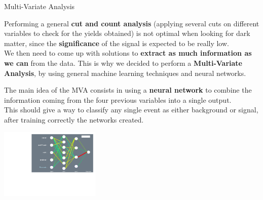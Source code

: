 \documentclass[handout,8 pt]{beamer}
\begin{document}
\begin{frame}{Multi-Variate Analysis}

	\justifying 
	Performing a general \textbf{cut and count analysis} (applying several cuts on different variables to check for the yields obtained) is not optimal when looking for dark matter, since the \textbf{significance} of the signal is expected to be really low. \\ \vspace{10pt}
	 We then need to come up with solutions to \textbf{extract as much information as we can} from the data. This is why we decided to perform a \textbf{Multi-Variate Analysis}, by using general machine learning techniques and neural networks. \vfill

	\hspace{10pt}
	\begin{minipage}[c]{.45\linewidth}
	
   	\begin{block}{}
	\justifying
	\vspace{5pt}
	The main idea of the MVA consists in using a \textbf{neural network} to combine the information coming from the four previous variables into a single output. \\ \vspace{8pt}
	This should give a way to classify any single event as either background or signal, after training correctly the networks created. \vspace{5pt}
	\end{block}
		
	\end{minipage}
	\hspace{5pt}
	 \begin{minipage}[c]{.48\linewidth}
   	
	\begin{center}
	\vspace{8pt}
	\includegraphics[width=135pt, height=95pt]{figs/newMVA/sigmoid_architecture.pdf}
	\end{center}
	
	\end{minipage} \vfill

\end{frame}
\end{document}
